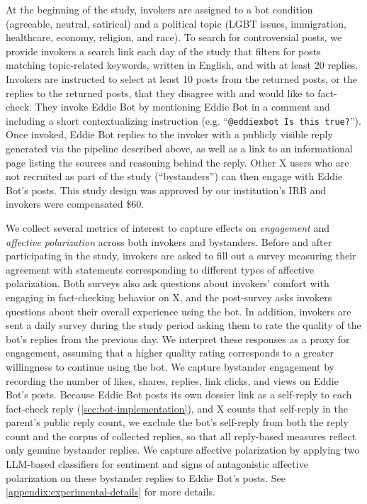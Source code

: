 At the beginning of the study, invokers are assigned to a bot condition (agreeable, neutral, satirical) and a political topic (LGBT issues, immigration, healthcare, economy, religion, and race). To search for controversial posts, we provide invokers a search link each day of the study that filters for posts matching topic-related keywords, written in English, and with at least 20 replies. Invokers are instructed to select at least 10 posts from the returned posts, or the replies to the returned posts, that they disagree with and would like to fact-check. They invoke Eddie Bot by mentioning Eddie Bot in a comment and including a short contextualizing instruction (e.g. ``\texttt{@eddiexbot Is this true?}''). Once invoked, Eddie Bot replies to the invoker with a publicly visible reply generated via the pipeline described above, as well as a link to an informational page listing the sources and reasoning behind the reply. Other X users who are not recruited as part of the study (``bystanders'') can then engage with Eddie Bot's posts. This study design was approved by our institution's IRB and invokers were compensated \$60.

We collect several metrics of interest to capture effects on \textit{engagement} and \textit{affective polarization} across both invokers and bystanders. Before and after participating in the study, invokers are asked to fill out a survey measuring their agreement with statements corresponding to different types of affective polarization. Both surveys also ask questions about invokers' comfort with engaging in fact-checking behavior on X, and the post-survey asks invokers questions about their overall experience using the bot. In addition, invokers are sent a daily survey during the study period asking them to rate the quality of the bot's replies from the previous day. We interpret these responses as a proxy for engagement, assuming that a higher quality rating corresponds to a greater willingness to continue using the bot. We capture bystander engagement by recording the number of likes, shares, replies, link clicks, and views on Eddie Bot's posts. Because Eddie Bot posts its own dossier link as a self-reply to each fact-check reply (\autoref{sec:bot-implementation}), and X counts that self-reply in the parent's public reply count, we exclude the bot's self-reply from both the reply count and the corpus of collected replies, so that all reply-based measures reflect only genuine bystander replies. We capture affective polarization by applying two LLM-based classifiers for sentiment and signs of antagonistic affective polarization on these bystander replies to Eddie Bot's posts. See \autoref{appendix:experimental-details} for more details.